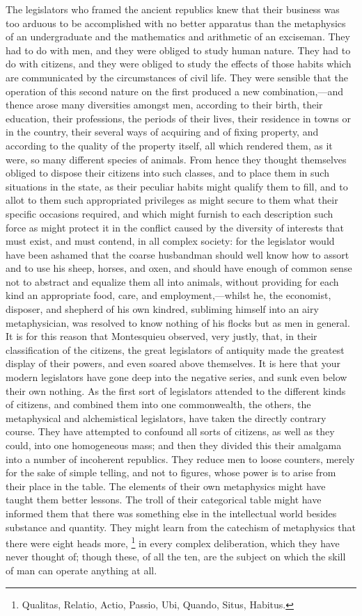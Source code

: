 The legislators who framed the ancient republics knew that their business was too arduous to be accomplished with no better apparatus than the metaphysics of an undergraduate and the mathematics and arithmetic of an exciseman. They had to do with men, and they were obliged to study human nature. They had to do with citizens, and they were obliged to study the effects of those habits which are communicated by the circumstances of civil life. They were sensible that the operation of this second nature on the first produced a new combination,—and thence arose many diversities amongst men, according to their birth, their education, their professions, the periods of their lives, their residence in towns or in the country, their several ways of acquiring and of fixing property, and according to the quality of the property itself, all which rendered them, as it were, so many different species of animals. From hence they thought themselves obliged to dispose their citizens into such classes, and to place them in such situations in the state, as their peculiar habits might qualify them to fill, and to allot to them such appropriated privileges as might secure to them what their specific occasions required, and which might furnish to each description such force as might protect it in the conflict caused by the diversity of interests that must exist, and must contend, in all complex society: for the legislator would have been ashamed that the coarse husbandman should well know how to assort and to use his sheep, horses, and oxen, and should have enough of common sense not to abstract and equalize them all into animals, without providing for each kind an appropriate food, care, and employment,—whilst he, the economist, disposer, and shepherd of his own kindred, subliming himself into an airy metaphysician, was resolved to know nothing of his flocks but as men in general. It is for this reason that Montesquieu observed, very justly, that, in their classification of the citizens, the great legislators of antiquity made the greatest display of their powers, and even soared above themselves. It is here that your modern legislators have gone deep into the negative series, and sunk even below their own nothing. As the first sort of legislators attended to the different kinds of citizens, and combined them into one commonwealth, the others, the metaphysical and alchemistical legislators, have taken the directly contrary course. They have attempted to confound all sorts of citizens, as well as they could, into one homogeneous mass; and then they divided this their amalgama into a number of incoherent republics. They reduce men to loose counters, merely for the sake of simple telling, and not to figures, whose power is to arise from their place in the table. The elements of their own metaphysics might have taught them better lessons. The troll of their categorical table might have informed them that there was something else in the intellectual world besides substance and quantity. They might learn from the catechism of metaphysics that there were eight heads more,
\footnote{ Qualitas, Relatio, Actio, Passio, Ubi, Quando, Situs, Habitus.}
 in every complex deliberation, which they have never thought of; though these, of all the ten, are the subject on which the skill of man can operate anything at all.

